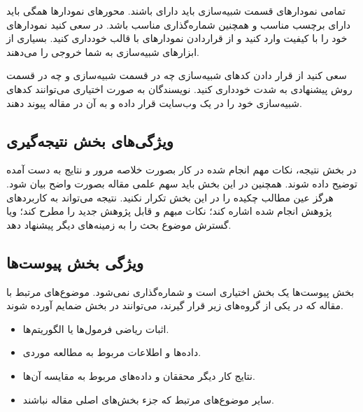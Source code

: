 \documentclass{CCI2020}
\begin{document}

تمامی نمودارهای قسمت شبیه‌سازی باید دارای  
 باشند. محور‌های نمودارها همگی باید دارای برچسب مناسب و همچنین شماره‌گذاری مناسب باشد. در 
\lr{\LaTeX}
 سعی کنید نمودارهای خود را با کیفیت 
 وارد کنید و از قراردادن نمودارهای  با قالب
 خودداری کنید. بسیاری از ابزارهای شبیه‌سازی به شما خروجی
   را می‌دهند. 

سعی کنید از قرار دادن کدهای شبیه‌سازی چه در قسمت شبیه‌سازی و چه در قسمت روش پیشنهادی به شدت خودداری کنید. نویسندگان به صورت اختیاری می‌توانند کدهای شبیه‌سازی خود را در یک وب‌سایت قرار داده و به آن در مقاله پیوند دهند. 

\subsection{ویژگی‌های بخش نتیجه‌گیری}
در بخش نتیجه، نکات مهم انجام شده در کار بصورت خلاصه مرور و نتایج به دست آمده توضیح داده شوند. همچنین در این بخش باید سهم علمی مقاله بصورت واضح بیان شود. هرگز عین مطالب چکیده را در این بخش تکرار نکنید. نتیجه می‌تواند به کاربردهای پژوهش انجام شده اشاره کند؛ نکات مبهم و قابل پژوهش جدید را مطرح کند؛ ویا گسترش موضوع بحث را به زمینه‌های دیگر پیشنهاد دهد.

\subsection{ویژگی بخش پیوست‌ها}
بخش پیوست‌ها یک بخش اختیاری است و شماره‌گذاری  نمی‌شود. موضوع‌های مرتبط با مقاله که در یکی از گروه‌های زیر قرار گیرند، می‌توانند در بخش ضمایم آورده شوند.
\begin{itemize}
\item
اثبات ریاضی فرمول‌ها یا الگوریتم‌ها.
\item
داده‌ها و اطلاعات مربوط به مطالعه موردی.
\item
نتایج کار دیگر محققان و داده‌های مربوط به مقایسه آن‌ها.
\item
سایر موضوع‌های مرتبط که جزء بخش‌های اصلی مقاله نباشند.
\end{itemize}
\end{document}
